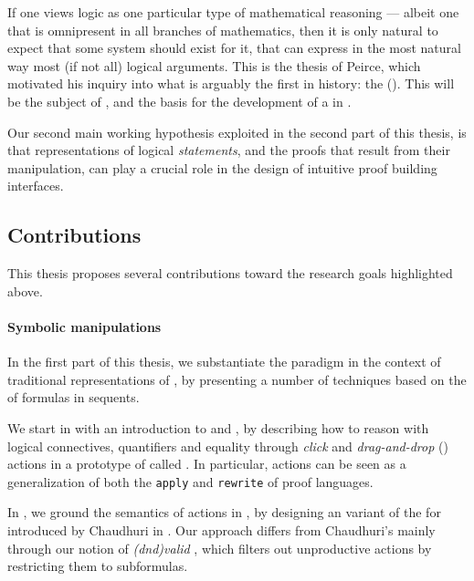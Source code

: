 \AP
If one views logic as one particular type of mathematical reasoning --- albeit
one that is omnipresent in all branches of mathematics, then it is only natural
to expect that some  system should exist for it, that can
express in the most natural way most (if not all) logical arguments. This is the
\emph{} thesis of Peirce, which motivated his inquiry into what is
arguably the first   in history: the
 (). This will be the subject of
, and the basis for the development of a \emph{}
 in .

\begin{emphpar}
  Our second main working hypothesis exploited in the second part of this
  thesis, is that  representations of logical \emph{statements}, and the
  proofs that result from their manipulation, can play a crucial role in the
  design of intuitive proof building interfaces.
\end{emphpar}

\subsection{Contributions}

This thesis proposes several contributions toward the research goals highlighted
above.

\paragraph{Symbolic manipulations}
  
In the first part of this thesis, we substantiate the  paradigm in the
context of traditional representations of , by presenting a number of
techniques based on the  of \emph{} formulas in
sequents.

\AP
We start in  with an introduction to  and , by
describing how to reason with logical connectives, quantifiers and equality
through \emph{click} and \emph{drag-and-drop} () actions in a
prototype of  called . In particular,  actions can
be seen as a generalization of both the \texttt{apply} and \texttt{rewrite}
 of  proof languages.

In , we ground the semantics of  actions in  , by designing an  variant of the
 for  introduced by Chaudhuri in \cite{Chaudhuri2013}.
Our approach differs from Chaudhuri's mainly through our notion of
\emph{\kl(dnd){valid} }, which filters out unproductive 
actions by restricting them to \emph{} subformulas.

